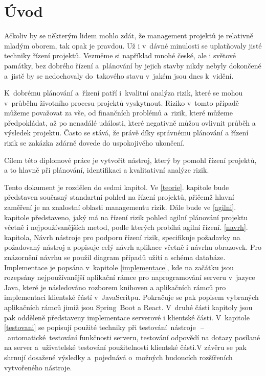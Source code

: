 
\chapter{Úvod}
Ačkoliv by se některým lidem mohlo zdát, že management projektů je relativně mladým oborem, tak opak je pravdou. Už i v~dávné minulosti se uplatňovaly jisté techniky řízení projektů. Vezměme si například mnohé české, ale i světové památky, bez dobrého řízení a~plánování by jejich stavby nikdy nebyly dokončené a~jistě by se nedochovaly do~takového stavu v~jakém jsou dnes k~vidění.

K~dobrému plánování a~řízení patří i~kvalitní analýza rizik, které se mohou v~průběhu životního procesu projektů vyskytnout. Riziko v~tomto případě můžeme považovat za vše, od finančních problémů a~rizik, které můžeme předpokládat, až po nenadálé události, které negativně můžou ovlivnit průběh a výsledek projektu. Často se stává, že právě díky správnému plánování a řízení rizik se zakázka zdárně dovede do uspokojivého ukončení.

Cílem této diplomové práce je vytvořit nástroj, který by pomohl řízení projektů, a to hlavně při plánování, identifikaci a kvalitativní analýze rizik. 

Tento dokument je rozdělen do sedmi kapitol. Ve \ref{teorie}. kapitole bude představen současný standartní pohled na řízení projektů, přičemž hlavní zaměření je na znalostní oblasti managementu rizik. Dále bude ve \ref{agilni}. kapitole představeno, jaký má na řízení rizik pohled agilní plánování projektu včetně i nejpoužívanějších metod, podle kterých probíhá agilní řízení. \ref{navrh}. kapitola, Návrh nástroje pro podporu řízení rizik, specifikuje požadavky na požadovaný nástroj a popisuje celý návrh aplikace včetně i návrhu obrazovek. Pro znázornění návrhu se použil diagram případů užití a schéma databáze. Implementace je popsána v~kapitole \ref{implementace}, kde na začátku jsou rozepsány nejpoužívanější aplikační rámce pro naprogramování serveru v~jazyce Java, které je následováno rozborem knihoven a aplikačních rámců pro implementaci klientské částí v~JavaScritpu. Pokračuje se pak popisem vybraných aplikačních rámců jimiž jsou Spring~Boot a React. V~druhé části kapitoly jsou pak odděleně představeny implementace serverové i klientské části. V~kapitole \ref{testovani} se popisují použité techniky při testování~nástroje~\,--\,~automatické~testování funkčnosti serveru, testování odpovědí na dotazy posílané na server a~uživatelské testování použitelnosti klientské části.V závěru se pak shrnují dosažené výsledky a~pojednává o~možných budoucích  rozšířeních vytvořeného nástroje.

